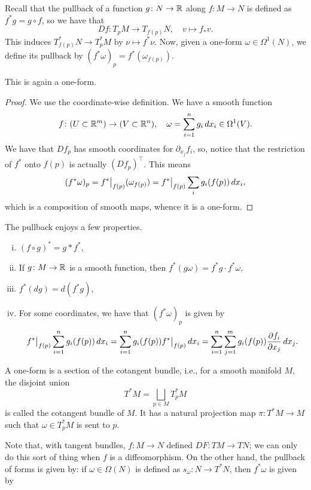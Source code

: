 Recall that the pullback of a function $g \colon N \to \mathbb R$ along $f \colon M \to N$ is defined as $f^\ast g = g \circ f$, so we have that
\[ Df \colon T_p M \to T_{f(p)} N, \quad v \mapsto f_\ast v. \]
This induces $T_{f(p)}^\ast N \to T_p^\ast M$ by $\nu \mapsto f^\ast \nu$. Now, given a one-form $\omega \in \Omega^1(N)$, we define its pullback by $(f^\ast \omega)_p = f^\ast(\omega_{f(p)})$.
\begin{proposition}[\S7.12]
    This is again a one-form.
\end{proposition}
\begin{proof}
    We use the coordinate-wise definition. We have a smooth function
    \[ f \colon (U \subset \mathbb R^m) \to (V \subset \mathbb R^n), \quad \omega = \sum_{i=1}^n g_i \, dx_i \in \Omega^1(V). \]
    We have that $Df_p$ has smooth coordinates for $\partial_{x_j} f_i$, so, notice that the restriction of $f^\ast$ onto $f(p)$ is actually $(Df_p)^\top$. This means
    \[ (f^\ast \omega)_p = \restr{f^\ast}{f(p)} (\omega_{f(p)}) = \restr{f^\ast}{f(p)} \sum_i g_i(f(p)) \, dx_i, \]
    which is a composition of smooth maps, whence it is a one-form.
\end{proof}
The pullback enjoys a few properties.
\begin{enumerate}[(i)]
    \item $(f \circ g)^\ast = g \ast f^\ast$,
    \item If $g \colon M \to \mathbb R$ is a smooth function, then $f^\ast(g \omega) = f^\ast g \cdot f^\ast \omega$,
    \item $f^\ast(dg) = d(f^\ast g)$,
    \item For some coordinates, we have that $(f^\ast \omega)_p$ is given by
    \[ \restr{f^\ast}{f(p)} \sum_{i=1}^n g_i(f(p)) \, dx_i = \sum_{i=1}^n g_i(f(p)) \restr{f^\ast}{f(p)} \, dx_i = \sum_{i=1}^n \sum_{j=1}^m g_i(f(p)) \frac{\partial f_i}{\partial x_j} \, dx_j. \]
\end{enumerate}
\begin{definition}[Abstract]
    A one-form is a section of the cotangent bundle, i.e., for a smooth manifold $M$, the disjoint union
    \[ T^\ast M = \bigsqcup_{p \in M} T_p^\ast M \]
    is called the cotangent bundle of $M$. It has a natural projection map $\pi \colon T^\ast M \to M$ such that $\omega \in T_p^\ast M$ is sent to $p$.
\end{definition}
Note that, with tangent bundles, $f \colon M \to N$ defined $DF \colon TM \to TN$; we can only do this sort of thing when $f$ is a diffeomorphism. On the other hand, the pullback of forms is given by: if $\omega \in \Omega(N)$ is defined as $s_\omega \colon N \to T^\ast N$, then $f^\ast \omega$ is given by
